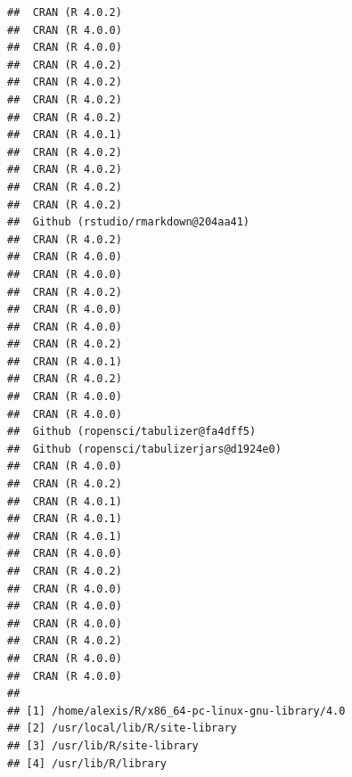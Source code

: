 \documentclass[
  french,
]{book}
\begin{document}
\begin{verbatim}
##  CRAN (R 4.0.2)                         
##  CRAN (R 4.0.0)                         
##  CRAN (R 4.0.0)                         
##  CRAN (R 4.0.2)                         
##  CRAN (R 4.0.2)                         
##  CRAN (R 4.0.2)                         
##  CRAN (R 4.0.2)                         
##  CRAN (R 4.0.1)                         
##  CRAN (R 4.0.2)                         
##  CRAN (R 4.0.2)                         
##  CRAN (R 4.0.2)                         
##  CRAN (R 4.0.2)                         
##  Github (rstudio/rmarkdown@204aa41)     
##  CRAN (R 4.0.2)                         
##  CRAN (R 4.0.0)                         
##  CRAN (R 4.0.0)                         
##  CRAN (R 4.0.2)                         
##  CRAN (R 4.0.0)                         
##  CRAN (R 4.0.0)                         
##  CRAN (R 4.0.2)                         
##  CRAN (R 4.0.1)                         
##  CRAN (R 4.0.2)                         
##  CRAN (R 4.0.0)                         
##  CRAN (R 4.0.0)                         
##  Github (ropensci/tabulizer@fa4dff5)    
##  Github (ropensci/tabulizerjars@d1924e0)
##  CRAN (R 4.0.0)                         
##  CRAN (R 4.0.2)                         
##  CRAN (R 4.0.1)                         
##  CRAN (R 4.0.1)                         
##  CRAN (R 4.0.1)                         
##  CRAN (R 4.0.0)                         
##  CRAN (R 4.0.2)                         
##  CRAN (R 4.0.0)                         
##  CRAN (R 4.0.0)                         
##  CRAN (R 4.0.0)                         
##  CRAN (R 4.0.2)                         
##  CRAN (R 4.0.0)                         
##  CRAN (R 4.0.0)                         
## 
## [1] /home/alexis/R/x86_64-pc-linux-gnu-library/4.0
## [2] /usr/local/lib/R/site-library
## [3] /usr/lib/R/site-library
## [4] /usr/lib/R/library
\end{verbatim}

  
\end{document}

